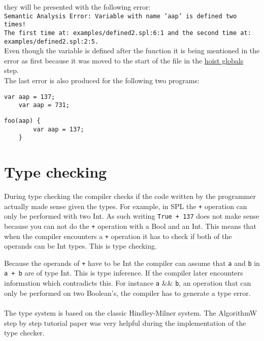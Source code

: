 \documentclass{report}
\begin{document}
they will be presented with the following error:\\

\noindent\texttt{\textcolor{error}{Semantic Analysis Error: Variable with name '\textcolor{name}{aap}' is defined two times!}\\
The first time at: \textcolor{filename}{examples/defined2.spl:6:1} and the second time at: \textcolor{filename}{examples/defined2.spl:2:5}.}\\

\noindent Even though the variable is defined after the function it is being mentioned in the error as first because it was moved to the start of the file in the \hyperref[sec:Hoist-globals]{hoist globals} step. \\

\noindent The last error is also produced for the following two programs:

\noindent %

\noindent
\begin{minipage}[t]{0.45\textwidth}
\begin{lstlisting}[style=SPL]
    var aap = 137;
    var aap = 731;
\end{lstlisting}
\end{minipage}
\begin{minipage}[t]{0.45\textwidth}
\begin{lstlisting}[style=SPL]
    foo(aap) {
        var aap = 137;
    }
\end{lstlisting}
\end{minipage}

\section{Type checking} \label{sec:Type-Checking}

During type checking the compiler checks if the code written by the programmer actually made sense given the types. For example, in SPL the \texttt{+} operation can only be performed with two Int. As such writing \texttt{True + 137} does not make sense because you can not do the \texttt{+} operation with a Bool and an Int. This means that when the compiler encounters a \texttt{+} operation it has to check if both of the operands can be Int types. This is type checking. 

Because the operands of \texttt{+} have to be Int the compiler can assume that \texttt{a} and \texttt{b} in \texttt{a + b} are of type Int. This is type inference. If the compiler later encounters information which contradicts this. For instance \texttt{a} \&\& \texttt{b}, an operation that can only be performed on two Boolean's, the compiler has to generate a type error. 
\\\\
The type system is based on the classic Hindley-Milner \cite{milner1978theory} system. The AlgorithmW step by step tutorial paper \cite{grabmuller2006algorithm} was very helpful during the implementation of the type checker.
\end{document}
